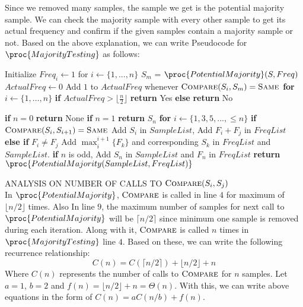 \documentclass[11pt]{article}
\begin{document}
Since we removed many samples, the sample we get is the potential majority sample. We can check the majority sample with every other sample to get its actual frequency and confirm if the given samples contain a majority sample or not. Based on the above explanation, we can write Pseudocode for $\proc{MajorityTesting}$ as follows:
\begin{codebox}
\li Initialize $Freq_i \leftarrow 1$ for $i \leftarrow \{1, ..., n\}$
\li $S_m$ = $\proc{PotentialMajority}(S, Freq)$
\li $ActualFreq \leftarrow 0$
\li Add $1$ to $ActualFreq$ whenever $\textsc{Compare}(S_i,S_m) = \textsc{Same}$ \textbf{for} $i \leftarrow \{1,\ldots, n\}$
\li \textbf{if} $ActualFreq > \lfloor \frac{n}{2} \rfloor$ \textbf{return} Yes
\li \textbf{else} \textbf{return} No
\end{codebox}


\begin{codebox}
\li \textbf{if} $n = 0$ \textbf{return} None
\li \textbf{if} $n = 1$ \textbf{return} $S_n$
\li \textbf{for} $i \leftarrow \{1,3,5,...,\leq n\}$
\li \quad \textbf{if} $\textsc{Compare}(S_i,S_{i+1}) = \textsc{Same}$
\li \quad \quad Add $S_i$ in $SampleList$, Add $F_i+F_j$ in $FreqList$
\li \quad \textbf{else if} $F_i\neq F_j$
\li \quad \quad Add $\max_i^{i+1}\{F_k\}$ and corresponding $S_k$ in $FreqList $ and $SampleList$.
\li \textbf{if} $n$ is odd, Add $S_n$ in $SampleList$ and $F_n$ in $FreqList$
\li \textbf{return} $\proc{PotentialMajority(SampleList, FreqList)}$
\end{codebox}

\noindent ANALYSIS ON NUMBER OF CALLS TO $\textsc{Compare}(S_i,S_j)$\\
In $\proc{PotentialMajority}$, $\textsc{Compare}$ is called in line $4$ for maximum of $\lfloor n/2 \rfloor$ times. Also In line $9$, the maximum number of samples for next call to $\proc{PotentialMajority}$ will be $\lceil n/2 \rceil$ since minimum one sample is removed during each iteration. Along with it, $\textsc{Compare}$ is called $n$ times in $\proc{MajorityTesting}$ line $4$. Based on these, we can write the following recurrence relationship:
$$C(n) = C(\lceil n/2 \rceil) + \lfloor n/2 \rfloor+n$$ 
Where $C(n)$ represents the number of calls to $\textsc{Compare}$ for $n$ samples. Let $a = 1$, $b=2$ and $f(n) = \lfloor n/2 \rfloor+n = \Theta(n)$. With this, we can write above equations in the form of
$C(n) = aC(n/b) + f(n)$.
\end{document}
